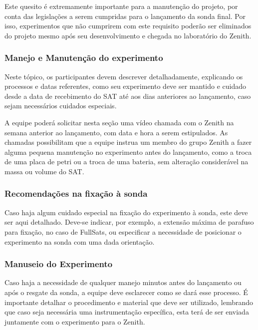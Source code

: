             Este quesito é extremamente importante para a manutenção do projeto, por conta das legislações a serem cumpridas para o lançamento da sonda final. Por isso, experimentos que não cumprirem com este requisito poderão ser eliminados do projeto mesmo após seu desenvolvimento e chegada no laboratório do Zenith.

        \subsubsection{Manejo e Manutenção do experimento}
            
            Neste tópico, os participantes devem descrever detalhadamente, explicando os processos e datas referentes, como seu experimento deve ser mantido e cuidado desde a data de recebimento do SAT até aos dias anteriores ao lançamento, caso sejam necessários cuidados especiais.
            
            A equipe poderá solicitar nesta seção uma vídeo chamada com o Zenith na semana anterior ao lançamento, com data e hora a serem estipulados. As chamadas possibilitam que a equipe instrua um membro do grupo Zenith a fazer alguma pequena manutenção no experimento antes do lançamento, como a troca de uma placa de petri ou a troca de uma bateria, sem alteração considerável na massa ou volume do SAT.

        \subsubsection{Recomendações na fixação à sonda}
            
            Caso haja algum cuidado especial na fixação do experimento à sonda, este deve ser aqui detalhado. Deve-se indicar, por exemplo, a extensão máxima de parafuso para fixação, no caso de FullSats, ou especificar a necessidade de posicionar o experimento na sonda com uma dada orientação.

        \subsubsection{Manuseio do Experimento}
            
            Caso haja a necessidade de qualquer manejo minutos antes do lançamento ou após o resgate da sonda, a equipe deve esclarecer como se dará esse processo. É importante detalhar o procedimento e material que deve ser utilizado, lembrando que caso seja necessária uma instrumentação específica, esta terá de ser enviada juntamente com o experimento para o Zenith.
        
